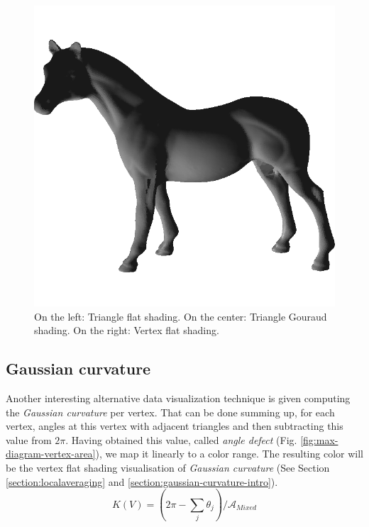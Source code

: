 \begin{figure}[!h]
    \endminipage\hfill
    \centering
    \includegraphics[scale=0.39]{images/horse-efs.png}
    \endminipage\hfill
    \caption{On the left: Triangle flat shading. On the center: Triangle Gouraud shading. On the right: Vertex flat shading.}
    \label{fig:comparison-gc-gci}
\end{figure}

\subsection{Gaussian curvature}
\label{section:vertex-area-gaussian-curvature}
Another interesting alternative data visualization technique is given computing the \textit{Gaussian curvature} per vertex. That can be done summing up, for each vertex, angles at this vertex with adjacent triangles and then subtracting this value from $2\pi$.
Having obtained this value, called \textit{angle defect} (Fig. \ref{fig:max-diagram-vertex-area}), we map it linearly to a color range.
The resulting color will be the vertex flat shading visualisation of \textit{Gaussian curvature} (See Section \ref{section:localaveraging} and \ref{section:gaussian-curvature-intro}).
$$K(V) = (2\pi - \sum_j \theta_j)/\mathcal{A}_{Mixed}$$


